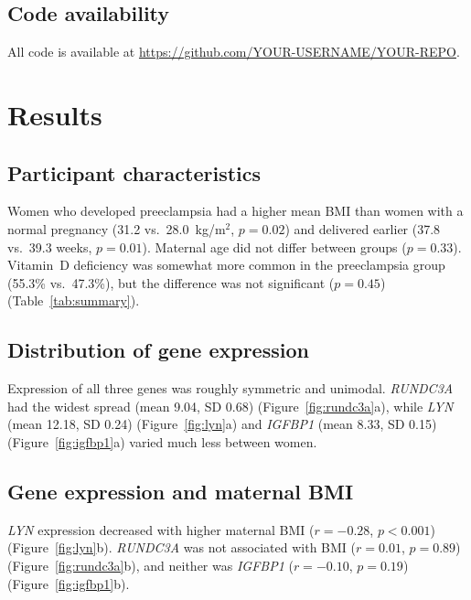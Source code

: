 \documentclass[11pt]{article}
\newcommand{\repourl}{https://github.com/YOUR-USERNAME/YOUR-REPO}
\begin{document}
\subsection{Code availability}
All code is available at \url{\repourl}.

\section{Results}

\subsection{Participant characteristics}
Women who developed preeclampsia had a higher mean BMI than women with a
normal pregnancy (31.2 vs.\ 28.0~kg/m$^2$, $p=0.02$) and delivered earlier
(37.8 vs.\ 39.3 weeks, $p=0.01$). Maternal age did not differ between groups
($p=0.33$). Vitamin~D deficiency was somewhat more common in the preeclampsia
group (55.3\% vs.\ 47.3\%), but the difference was not significant ($p=0.45$)
(Table~\ref{tab:summary}).

\begin{table}[H]
  \centering
  \caption{Participant characteristics by pregnancy outcome. Continuous
  variables are mean (SD) and compared with Welch $t$-tests. Vitamin~D status
  is $n$ (\%) within each outcome group and compared with a chi-squared test.}
  \label{tab:summary}
  \resizebox{\textwidth}{!}{}
\end{table}

\subsection{Distribution of gene expression}
Expression of all three genes was roughly symmetric and unimodal.
\textit{RUNDC3A} had the widest spread (mean 9.04, SD 0.68)
(Figure~\ref{fig:rundc3a}a), while \textit{LYN} (mean 12.18, SD 0.24)
(Figure~\ref{fig:lyn}a) and \textit{IGFBP1} (mean 8.33, SD 0.15)
(Figure~\ref{fig:igfbp1}a) varied much less between women.

\subsection{Gene expression and maternal BMI}
\textit{LYN} expression decreased with higher maternal BMI ($r=-0.28$,
$p<0.001$) (Figure~\ref{fig:lyn}b). \textit{RUNDC3A} was not associated with
BMI ($r=0.01$, $p=0.89$) (Figure~\ref{fig:rundc3a}b), and neither was
\textit{IGFBP1} ($r=-0.10$, $p=0.19$) (Figure~\ref{fig:igfbp1}b).
\end{document}
